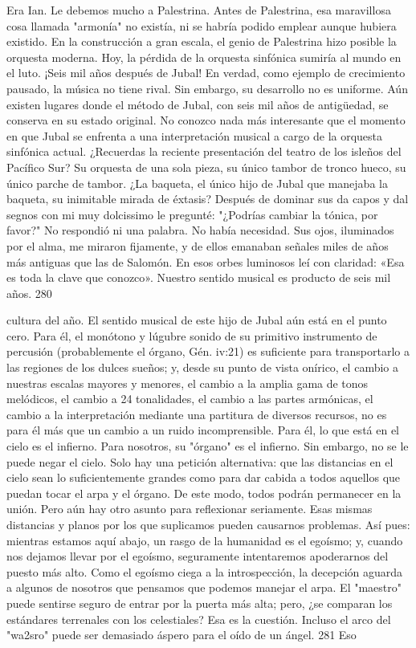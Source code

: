 Era Ian. Le debemos mucho a Palestrina. Antes de Palestrina, esa maravillosa cosa llamada "armonía" no existía, ni se habría podido emplear aunque hubiera existido. En la construcción a gran escala, el genio de Palestrina hizo posible la orquesta moderna. Hoy, la pérdida de la orquesta sinfónica
sumiría al mundo en el luto. ¡Seis mil años después de Jubal!
En verdad, como ejemplo de crecimiento pausado, la música no tiene rival. Sin embargo, su desarrollo no es uniforme. Aún existen lugares donde el método de Jubal, con seis mil años de antigüedad, se conserva en su estado original. No conozco nada más interesante que el momento en que Jubal se enfrenta a una interpretación musical a cargo de la orquesta sinfónica actual.
¿Recuerdas la reciente presentación del teatro de los isleños del Pacífico Sur? Su orquesta de una sola pieza, su único tambor de tronco hueco, su único parche de tambor.
¿La baqueta, el único hijo de Jubal que manejaba la baqueta, su inimitable mirada de éxtasis?
Después de dominar sus da capos y dal segnos con mi muy dolcissimo le pregunté: "¿Podrías cambiar la tónica, por favor?"
No respondió ni una palabra.
No había necesidad.
Sus ojos, iluminados por el alma, me miraron fijamente, y de ellos emanaban señales miles de años más antiguas que las de Salomón. En esos orbes luminosos leí con claridad: «Esa es toda la clave que conozco».
Nuestro sentido musical es producto de seis mil años.
280

cultura del año. El sentido musical de este hijo de Jubal aún está en el punto cero. Para él, el monótono y lúgubre sonido de su primitivo instrumento de percusión (probablemente el órgano, Gén. iv:21) es suficiente para transportarlo a las regiones de los dulces sueños; y, desde su punto de vista onírico, el cambio a nuestras escalas mayores y menores, el cambio a la amplia gama de tonos melódicos, el cambio a 24 tonalidades, el cambio a las partes armónicas, el cambio a la interpretación mediante una partitura de diversos recursos, no es para él más que un cambio a un ruido incomprensible.
Para él, lo que está en el cielo es el infierno. Para nosotros, su "órgano" es el infierno.
Sin embargo, no se le puede negar el cielo.
Solo hay una petición alternativa: que las distancias en el cielo sean lo suficientemente grandes como para dar cabida a todos aquellos que puedan tocar el arpa y el órgano.
De este modo, todos podrán permanecer en la unión.
Pero aún hay otro asunto para reflexionar seriamente. Esas mismas distancias y planos por los que suplicamos pueden causarnos problemas. Así pues: mientras estamos aquí abajo, un rasgo de la humanidad es el egoísmo; y, cuando nos dejamos llevar por el egoísmo, seguramente intentaremos apoderarnos del puesto más alto. Como el egoísmo ciega a la introspección, la decepción aguarda a algunos de nosotros que pensamos que podemos manejar el arpa. El "maestro" puede sentirse seguro de entrar por la puerta más alta; pero, ¿se comparan los estándares terrenales con los celestiales? Esa es la cuestión. Incluso el arco del
"wa2sro" puede ser demasiado áspero para el oído de un ángel. 281	Eso

